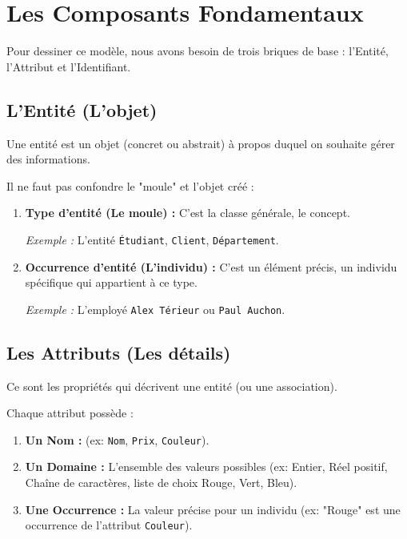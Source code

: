\section{Les Composants Fondamentaux}

Pour dessiner ce modèle, nous avons besoin de trois briques de base : l'Entité, l'Attribut et l'Identifiant.

\subsection{L'Entité (L'objet)}

\begin{definition}
Une entité est un objet (concret ou abstrait) à propos duquel on souhaite gérer des informations.
\end{definition}

Il ne faut pas confondre le "moule" et l'objet créé :

\begin{enumerate}
\item \textbf{Type d'entité (Le moule) :} C'est la classe générale, le concept.

\textit{Exemple :} L'entité \texttt{Étudiant}, \texttt{Client}, \texttt{Département}.

\item \textbf{Occurrence d'entité (L'individu) :} C'est un élément précis, un individu spécifique qui appartient à ce type.

\textit{Exemple :} L'employé \texttt{Alex Térieur} ou \texttt{Paul Auchon}.
\end{enumerate}

\subsection{Les Attributs (Les détails)}

\begin{definition}
Ce sont les propriétés qui décrivent une entité (ou une association).
\end{definition}

Chaque attribut possède :

\begin{enumerate}
\item \textbf{Un Nom :} (ex: \texttt{Nom}, \texttt{Prix}, \texttt{Couleur}).
\item \textbf{Un Domaine :} L'ensemble des valeurs possibles (ex: Entier, Réel positif, Chaîne de caractères, liste de choix {Rouge, Vert, Bleu}).
\item \textbf{Une Occurrence :} La valeur précise pour un individu (ex: "Rouge" est une occurrence de l'attribut \texttt{Couleur}).
\end{enumerate}

